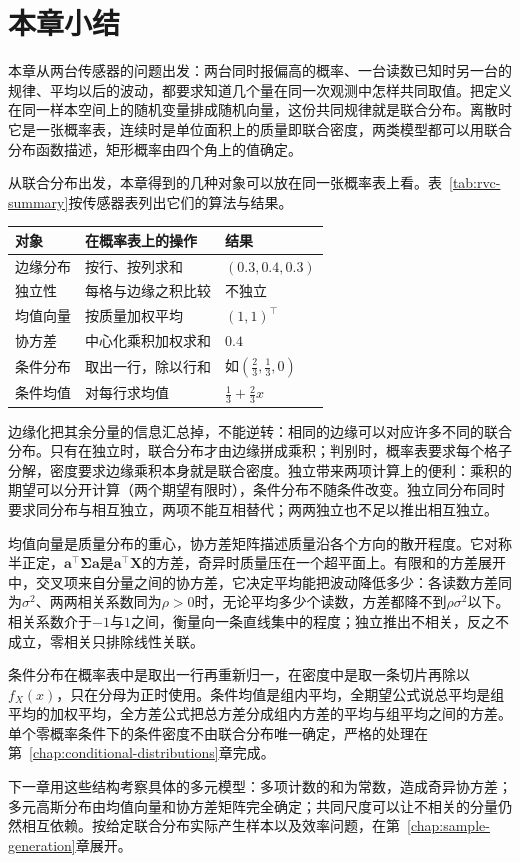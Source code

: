 \section{本章小结}
\label{sec:rvc-summary}

本章从两台传感器的问题出发：两台同时报偏高的概率、一台读数已知时另一台的规律、平均以后的波动，都要求知道几个量在同一次观测中怎样共同取值。把定义在同一样本空间上的随机变量排成随机向量，这份共同规律就是联合分布。离散时它是一张概率表，连续时是单位面积上的质量即联合密度，两类模型都可以用联合分布函数描述，矩形概率由四个角上的值确定。

从联合分布出发，本章得到的几种对象可以放在同一张概率表上看。表~\ref{tab:rvc-summary}按传感器表列出它们的算法与结果。

\begin{BookInlineTable}
  \centering
  \caption{从联合分布得到的对象（传感器表）}
  \label{tab:rvc-summary}
  \begin{tabular}{lll}
    \toprule
    对象 & 在概率表上的操作 & 结果 \\
    \midrule
    边缘分布 & 按行、按列求和 & $(0.3,0.4,0.3)$ \\
    独立性 & 每格与边缘之积比较 & 不独立 \\
    均值向量 & 按质量加权平均 & $(1,1)^{\top}$ \\
    协方差 & 中心化乘积加权求和 & $0.4$ \\
    条件分布 & 取出一行，除以行和 & 如$(\tfrac23,\tfrac13,0)$ \\
    条件均值 & 对每行求均值 & $\tfrac13+\tfrac23x$ \\
    \bottomrule
  \end{tabular}
\end{BookInlineTable}

边缘化把其余分量的信息汇总掉，不能逆转：相同的边缘可以对应许多不同的联合分布。只有在独立时，联合分布才由边缘拼成乘积；判别时，概率表要求每个格子分解，密度要求边缘乘积本身就是联合密度。独立带来两项计算上的便利：乘积的期望可以分开计算（两个期望有限时），条件分布不随条件改变。独立同分布同时要求同分布与相互独立，两项不能互相替代；两两独立也不足以推出相互独立。

均值向量是质量分布的重心，协方差矩阵描述质量沿各个方向的散开程度。它对称半正定，$\bm{a}^{\top}\bm{\Sigma}\bm{a}$是$\bm{a}^{\top}\bm{X}$的方差，奇异时质量压在一个超平面上。有限和的方差展开中，交叉项来自分量之间的协方差，它决定平均能把波动降低多少：各读数方差同为$\sigma^{2}$、两两相关系数同为$\rho>0$时，无论平均多少个读数，方差都降不到$\rho\sigma^{2}$以下。相关系数介于$-1$与$1$之间，衡量向一条直线集中的程度；独立推出不相关，反之不成立，零相关只排除线性关联。

条件分布在概率表中是取出一行再重新归一，在密度中是取一条切片再除以$f_X(x)$，只在分母为正时使用。条件均值是组内平均，全期望公式说总平均是组平均的加权平均，全方差公式把总方差分成组内方差的平均与组平均之间的方差。单个零概率条件下的条件密度不由联合分布唯一确定，严格的处理在第~\ref{chap:conditional-distributions}章完成。

下一章用这些结构考察具体的多元模型：多项计数的和为常数，造成奇异协方差；多元高斯分布由均值向量和协方差矩阵完全确定；共同尺度可以让不相关的分量仍然相互依赖。按给定联合分布实际产生样本以及效率问题，在第~\ref{chap:sample-generation}章展开。
